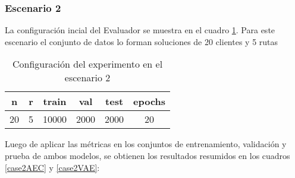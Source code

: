 \begin{figure}[!h]
	\label{space_case1}
\end{figure}

\begin{figure}[!h]
	\label{space_case1vae}
\end{figure}

\newpage

\subsubsection{Escenario 2}

La configuración incial del Evaluador se muestra en el cuadro \ref{case2}. Para este escenario el conjunto de datos lo forman soluciones de 20 clientes y 5 rutas 

\begin{table}[h]
	\centering
	\caption{Configuración del experimento en el escenario 2}
	\begin{tabular}{|c|c|c|c|c|c|}
		\hline
		\textbf{n} & \textbf{r} & \textbf{train} & \textbf{val} & \textbf{test} & \textbf{epochs} \\
		\hline
		20 & 5 & 10000 & 2000 & 2000 & 20 \\
		\hline
	\end{tabular}
	\label{case2}
\end{table}

Luego de aplicar las métricas en los conjuntos de entrenamiento, validación y prueba de ambos modelos, se obtienen los resultados resumidos en los cuadros \ref{case2AEC} y \ref{case2VAE}:

